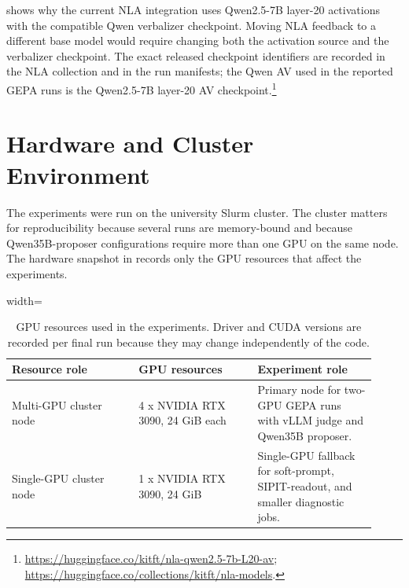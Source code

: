 \documentclass[12pt,a4paper,twoside,openright]{book}
\begin{document}
 shows why the current NLA integration uses
Qwen2.5-7B layer-20 activations with the compatible Qwen verbalizer checkpoint.
Moving NLA feedback to a different base model would require changing both the
activation source and the verbalizer checkpoint.
The exact released checkpoint identifiers are recorded in the NLA collection and
in the run manifests; the Qwen AV used in the reported GEPA runs is the
Qwen2.5-7B layer-20 AV checkpoint.\footnote{\url{https://huggingface.co/kitft/nla-qwen2.5-7b-L20-av};
\url{https://huggingface.co/collections/kitft/nla-models}.}

\section{Hardware and Cluster Environment}
\label{sec:setup-environment}

The experiments were run on the university Slurm cluster. The cluster matters
for reproducibility because several runs are memory-bound and because
Qwen35B-proposer configurations require more than one GPU on the same node.
The hardware snapshot in  records only the GPU
resources that affect the experiments.

\begin{table}[!htb]
    \centering
    \scriptsize
    \begin{adjustbox}{width=\textwidth}
    \begin{tabular}{p{0.32\linewidth} p{0.30\linewidth} p{0.30\linewidth}}
        \toprule
        \textbf{Resource role} & \textbf{GPU resources} & \textbf{Experiment role} \\
        \midrule
        Multi-GPU cluster node &
        4 x NVIDIA RTX 3090, 24 GiB each &
        Primary node for two-GPU GEPA runs with vLLM judge and Qwen35B proposer. \\
        Single-GPU cluster node &
        1 x NVIDIA RTX 3090, 24 GiB &
        Single-GPU fallback for soft-prompt, SIPIT-readout, and smaller diagnostic jobs. \\
        \bottomrule
    \end{tabular}
    \end{adjustbox}
    \caption{GPU resources used in the experiments. Driver and CUDA
    versions are recorded per final run because they may change independently of
    the code.}
    \label{tab:cluster-hardware}
\end{table}
\end{document}
